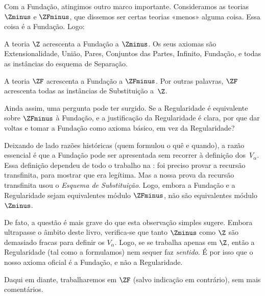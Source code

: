 \documentclass[../../../include/open-logic-section]{subfiles}
\begin{document}

Com a Fundação, atingimos outro marco importante. Consideramos as teorias $\Zminus$ e $\ZFminus$, que dissemos ser certas teorias «menos» alguma coisa. Essa coisa é a Fundação. Logo:

\begin{defn}
A teoria $\Z$ acrescenta a Fundação a $\Zminus$. Os seus axiomas são
Extensionalidade, União, Pares, Conjuntos das Partes, Infinito, Fundação, e todas
as instâncias do esquema de Separação.

A teoria $\ZF$ acrescenta a Fundação a $\ZFminus$. Por outras palavras, $\ZF$
acrescenta todas as instâncias de Substituição a~$\Z$.
\end{defn}

Ainda assim, uma pergunta pode ter surgido. Se a Regularidade é
equivalente sobre $\ZFminus$ à Fundação, e a justificação da Regularidade é clara, por que dar voltas e tomar
a Fundação como axioma básico, em vez da Regularidade? 

Deixando de lado razões históricas (quem formulou o quê e
quando), a razão essencial é que a Fundação pode ser apresentada sem
recorrer à definição dos~$V_\alpha$. Essa definição dependeu
de todo o trabalho na : foi preciso
provar a recursão transfinita, para mostrar que era legítima.
Mas a nossa prova da recursão transfinita usou o \emph{Esquema de Substituição}.
Logo, embora a Fundação e a Regularidade sejam equivalentes módulo $\ZFminus$,
não são equivalentes módulo $\Zminus$. 

De fato, a questão é mais grave do que esta observação simples sugere.
Embora ultrapasse o âmbito deste livro, verifica-se que tanto
$\Zminus$ como $\Z$ são demasiado fracas para definir os $V_\alpha$. Logo, se
se trabalha apenas em $\Z$, então a Regularidade (tal como a formulamos)
nem sequer faz \emph{sentido}. É por isso que o nosso axioma oficial é a
Fundação, e não a Regularidade. 

Daqui em diante, trabalharemos em $\ZF$ (salvo indicação em contrário), sem
mais comentários. 
\end{document}
